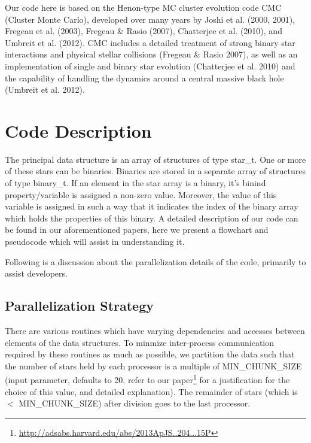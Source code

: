 \documentclass[11pt]{article}
\begin{document}
Our code here is based on the Henon-type MC cluster evolution code CMC (Cluster Monte Carlo), developed over many years by Joshi et al. (2000, 2001), Fregeau et al. (2003), Fregeau \& Rasio (2007), Chatterjee et al. (2010), and Umbreit et al. (2012). CMC includes a detailed treatment of strong binary star interactions and physical stellar collisions (Fregeau \& Rasio 2007), as well as an implementation of single and binary star evolution (Chatterjee et al. 2010) and the capability of handling the dynamics around a central massive black hole (Umbreit et al. 2012).


\section{Code Description}
The principal data structure is an array of structures of type star\_t. One or more of these stars can be binaries. Binaries are stored in a separate array of structures of type binary\_t. If an element in the star array is a binary, it's binind property/variable is assigned a non-zero value. Moreover, the value of this variable is assigned in such a way that it indicates the index of the binary array which holds the properties of this binary. A detailed description of our code can be found in our aforementioned papers, here we present a flowchart and pseudocode which will assist in understanding it.




Following is a discussion about the parallelization details of the code, primarily to assist developers.

\subsection{Parallelization Strategy}
There are various routines which have varying dependencies and accesses between elements of the data structures. To minmize inter-process communication required by these routines as much as possible, we partition the data such that the number of stars held by each processor is a multiple of MIN\_CHUNK\_SIZE (input parameter, defaults to 20, refer to our paper\footnote{\label{note_paper}\url{http://adsabs.harvard.edu/abs/2013ApJS..204...15P}} for a justification for the choice of this value, and detailed explanation). The remainder of stars (which is $<$ MIN\_CHUNK\_SIZE) after division goes to the last processor.
\end{document}
